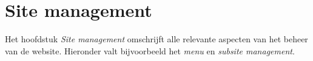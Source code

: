 
\section{Site management}\label{sitemanagement}

Het hoofdstuk \emph{Site management} omschrijft alle relevante aspecten van het beheer van de website. Hieronder valt bijvoorbeeld het \emph{menu} en \emph{subsite management}.












